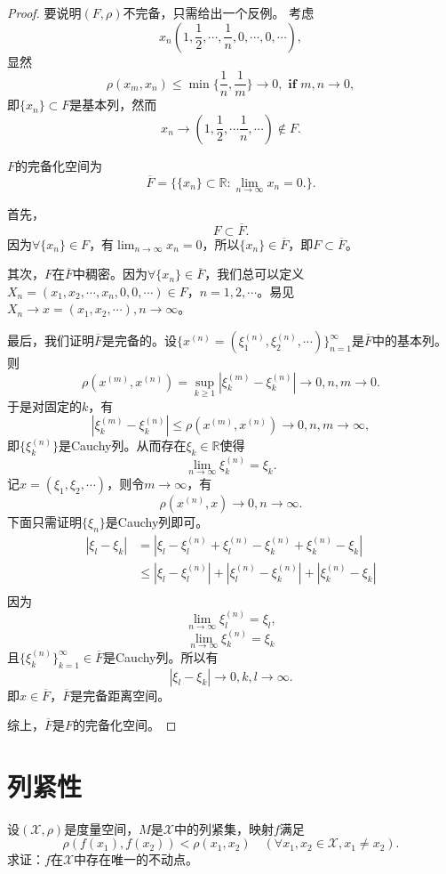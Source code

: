 \begin{proof}
要说明$(F,\rho)$不完备，只需给出一个反例。
考虑$$x_n(1,\frac{1}{2},\cdots,\frac{1}{n},0,\cdots,0,\cdots),$$
显然$$\rho(x_m,x_n)\leq\min\{\frac{1}{n},\frac{1}{m}\}\rightarrow0,\textbf{ if }m,n\rightarrow0,$$
即$\{x_n\}\subset F$是基本列，然而
$$x_n\rightarrow(1,\frac{1}{2},\cdots\frac{1}{n},\cdots)\not\in F.$$

$F$的完备化空间为
$$\overline{F}=\{\{x_n\}\subset\mathbb{R}:\lim_{n\rightarrow\infty}x_n=0.\}.$$

首先，$$F\subset\overline{F}.$$
因为$\forall\{x_n\}\in F$，有$\lim_{n\rightarrow\infty}x_n=0$，所以$\{x_n\}\in\overline{F}$，即$F\subset\overline{F}$。

其次，$F$在$\overline{F}$中稠密。因为$\forall\{x_n\}\in\overline{F}$，我们总可以定义$X_n=(x_1,x_2,\cdots,x_n,0,0,\cdots)\in F$，$n=1,2,\cdots$。易见$X_n\rightarrow x=(x_1,x_2,\cdots),n\rightarrow\infty$。

最后，我们证明$\overline{F}$是完备的。设$\{x^{(n)}=(\xi_1^{(n)},\xi_2^{(n)},\cdots)\}_{n=1}^{\infty}$是$\overline{F}$中的基本列。则$$\rho(x^{(m)},x^{(n)})=\sup_{k\geq1}|\xi_k^{(m)}-\xi_k^{(n)}|\rightarrow0,n,m\rightarrow0.$$
于是对固定的$k$，有
$$|\xi_k^{(m)}-\xi_k^{(n)}|\leq\rho(x^{(m)},x^{(n)})\rightarrow0,n,m\rightarrow\infty,$$
即$\{\xi_k^{(n)}\}$是Cauchy列。从而存在$\xi_k\in\mathbb{R}$使得$$\lim_{n\rightarrow\infty}\xi_k^{(n)}=\xi_k.$$
记$x=(\xi_1,\xi_2,\cdots)$，则令$m\rightarrow\infty$，有
$$\rho(x^{(n)},x)\rightarrow0,n\rightarrow\infty.$$
下面只需证明$\{\xi_n\}$是Cauchy列即可。
\begin{align*}
|\xi_l-\xi_k|&=|\xi_l-\xi_l^{(n)}+\xi_l^{(n)}-\xi_k^{(n)}+\xi_k^{(n)}-\xi_k|\\
&\leq|\xi_l-\xi_l^{(n)}|+|\xi_l^{(n)}-\xi_k^{(n)}|+|\xi_k^{(n)}-\xi_k|\\
\end{align*}
因为$$\lim_{n\rightarrow\infty}\xi_l^{(n)}=\xi_l,$$$$\lim_{n\rightarrow\infty}\xi_k^{(n)}=\xi_k$$
且$\{\xi_k^{(n)}\}_{k=1}^{\infty}\in\overline{F}$是Cauchy列。所以有
$$|\xi_l-\xi_k|\rightarrow0,k,l\rightarrow\infty.$$
即$x\in\overline{F}$，$\overline{F}$是完备距离空间。

综上，$\overline{F}$是$F$的完备化空间。
\end{proof}

\section{列紧性}

\begin{exercise}
设$(\mathscr{X},\rho)$是度量空间，$M$是$\mathscr{X}$中的列紧集，映射$f$满足
$$\rho(f(x_1),f(x_2))<\rho(x_1,x_2)\quad(\forall x_1,x_2\in\mathscr{X},x_1\neq x_2).$$
求证：$f$在$\mathscr{X}$中存在唯一的不动点。
\end{exercise}


